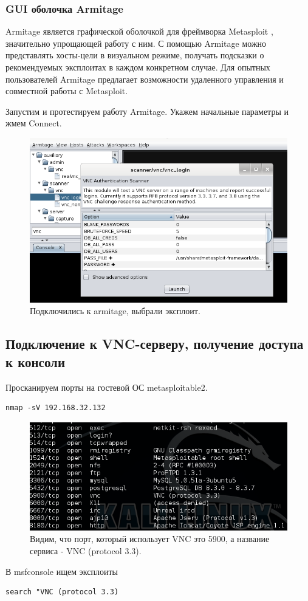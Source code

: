 \documentclass[a4paper, 14pt]{article}				%
\begin{document}
\subsubsection{GUI оболочка Armitage}
Armitage является графической оболочкой для фреймворка Metasploit , значительно упрощающей работу с ним. С помощью Armitage можно представлять хосты-цели в визуальном режиме, получать подсказки о рекомендуемых эксплоитах в каждом конкретном случае. Для опытных пользователей Armitage предлагает возможности удаленного управления и совместной работы с Metasploit.

Запустим и протестируем работу Armitage. Укажем начальные параметры и жмем Connect.

\begin{figure}[h!]
\centering
\includegraphics[width=\textwidth]{rsrc/lab5_armitage}
\caption{Подключились к armitage, выбрали эксплоит.}
\end{figure}

\subsection{Подключение к VNC-серверу, получение доступа к консоли}
Просканируем порты на гостевой ОС metasploitable2.\\
\begin{Verbatim}[frame=single]
nmap -sV 192.168.32.132
\end{Verbatim}

\begin{figure}[h!]
\centering
\includegraphics[width=\textwidth]{rsrc/lab5_vnc_port}
\caption{Видим, что порт, который использует VNC это 5900, а название сервиса - VNC (protocol 3.3).}
\end{figure}
В msfconsole ищем эксплоиты
\begin{Verbatim}[frame=single]
search "VNC (protocol 3.3)
\end{Verbatim}
\end{document}
